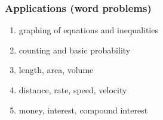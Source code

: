 \documentclass[12pt]{article}
\begin{document}
\subsubsection*{Applications (word problems)}
\begin{enumerate}
\item graphing of equations and inequalities
\item counting and basic probability
\item length, area, volume
\item distance, rate, speed, velocity
\item money,  interest, compound interest
\end{enumerate}
\end{document}
